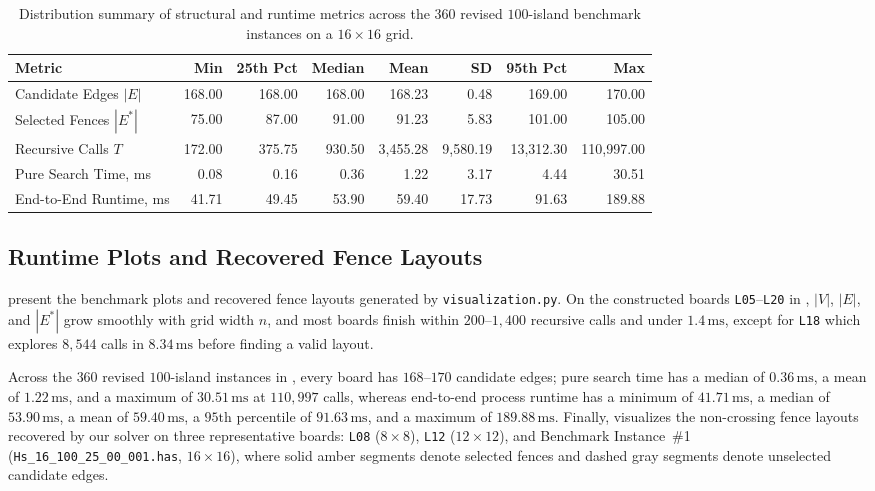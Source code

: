 \documentclass[10pt, a4paper]{article}
\newcommand{\code}[1]{\texttt{\color{primary!90!black}#1}}
\begin{document}
\vspace{-0.2em}
\begin{table}[H]
\centering
\caption{Distribution summary of structural and runtime metrics across the $360$ revised $100$-island benchmark instances on a $16 \times 16$ grid.}
\label{tab:groups}
\renewcommand{\arraystretch}{0.95}
\setlength{\tabcolsep}{4.8pt}
\begin{tabular}{@{}lrrrrrrr@{}}
\toprule
\textbf{\color{primary}Metric} & \textbf{\color{primary}Min} & \textbf{\color{primary}25th Pct} & \textbf{\color{primary}Median} & \textbf{\color{primary}Mean} & \textbf{\color{primary}SD} & \textbf{\color{primary}95th Pct} & \textbf{\color{primary}Max} \\
\midrule
Candidate Edges $|E|$          & 168.00 & 168.00 & 168.00 &   168.23 &     0.48 &    169.00 &     170.00 \\
Selected Fences $|E^*|$        &  75.00 &  87.00 &  91.00 &    91.23 &     5.83 &    101.00 &     105.00 \\
Recursive Calls $T$            & 172.00 & 375.75 & 930.50 & 3{,}455.28 & 9{,}580.19 & 13{,}312.30 & 110{,}997.00 \\
Pure Search Time, ms           &   0.08 &   0.16 &   0.36 &     1.22 &     3.17 &      4.44 &      30.51 \\
End-to-End Runtime, ms         &  41.71 &  49.45 &  53.90 &    59.40 &    17.73 &     91.63 &     189.88 \\
\bottomrule
\end{tabular}
\end{table}
\vspace{-0.3em}

\subsection{Runtime Plots and Recovered Fence Layouts}
 present the benchmark plots and recovered fence layouts generated by \code{visualization.py}. On the constructed boards \code{L05}--\code{L20} in , $|V|$, $|E|$, and $|E^*|$ grow smoothly with grid width $n$, and most boards finish within $200\text{--}1{,}400$ recursive calls and under $1.4\,\text{ms}$, except for \code{L18} which explores $8{,}544$ calls in $8.34\,\text{ms}$ before finding a valid layout.

Across the $360$ revised $100$-island instances in , every board has $168\text{--}170$ candidate edges; pure search time has a median of $0.36\,\text{ms}$, a mean of $1.22\,\text{ms}$, and a maximum of $30.51\,\text{ms}$ at $110{,}997$ calls, whereas end-to-end process runtime has a minimum of $41.71\,\text{ms}$, a median of $53.90\,\text{ms}$, a mean of $59.40\,\text{ms}$, a $95\text{th}$ percentile of $91.63\,\text{ms}$, and a maximum of $189.88\,\text{ms}$. Finally,  visualizes the non-crossing fence layouts recovered by our solver on three representative boards: \code{L08} ($8 \times 8$), \code{L12} ($12 \times 12$), and Benchmark Instance~\#1 (\code{Hs\_16\_100\_25\_00\_001.has}, $16 \times 16$), where solid amber segments denote selected fences and dashed gray segments denote unselected candidate edges.
\end{document}

